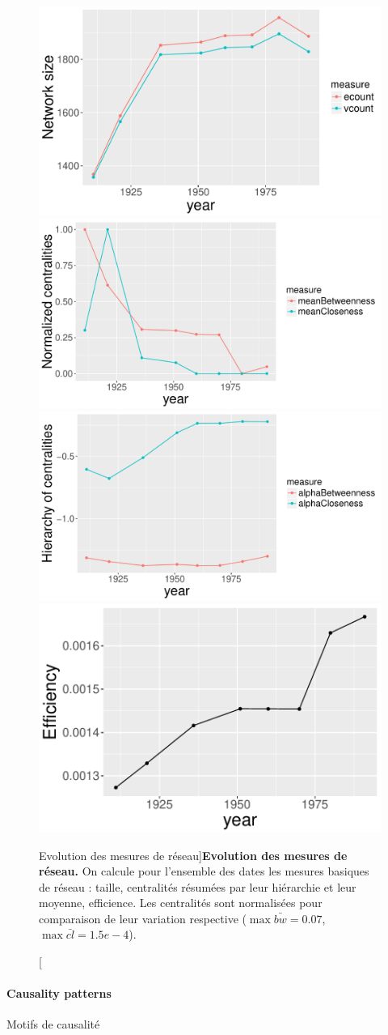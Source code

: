 \begin{figure}[h!]
\includegraphics[width=0.42\linewidth]{Figures/CausalityRegimes/nw_nwSize}
\includegraphics[width=0.47\linewidth]{Figures/CausalityRegimes/nw_meanCentralities}\\
\includegraphics[width=0.48\linewidth]{Figures/CausalityRegimes/nw_hierarchies}
\includegraphics[width=0.41\linewidth]{Figures/CausalityRegimes/nw_efficiency}
\caption[Evolution of network measures][Evolution des mesures de réseau]{\label{fig:causalityregimes:network}}{\textbf{Evolution des mesures de réseau.} On calcule pour l'ensemble des dates les mesures basiques de réseau : taille, centralités résumées par leur hiérarchie et leur moyenne, efficience. Les centralités sont normalisées pour comparaison de leur variation respective ($\max \bar{bw} = 0.07$, $\max \bar{cl} = 1.5e-4$).\label{fig:causalityregimes:network}}
\end{figure}



\paragraph{Causality patterns}{Motifs de causalité}


